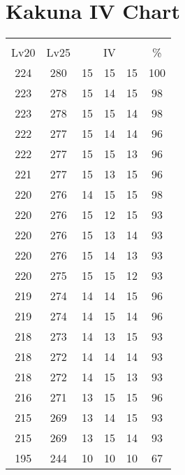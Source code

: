 \documentclass{article}%
\begin{document}
%
\normalsize%
\section{Kakuna IV Chart}%
\label{sec:Kakuna IV Chart}%
\renewcommand{\arraystretch}{1.5}%
\begin{tabular}{|c|c|c|c|c|c|}%
\hline%
\multicolumn{6}{|c|}{\textcolor{white}{ 
\linebreak{Kakuna}
}%
\cellcolor{black}}\\%
\multicolumn{1}{|c}{Lv20}&\multicolumn{1}{c|}{Lv25}&\multicolumn{3}{c|}{IV}&\multicolumn{1}{|c|}{\%}\\%
\hline%
\rowcolor{color100}%
224&280&15&15&15&100\\%
\hline%
\rowcolor{color98}%
223&278&15&14&15&98\\%
\hline%
\rowcolor{color98}%
223&278&15&15&14&98\\%
\hline%
\rowcolor{color96}%
222&277&15&14&14&96\\%
\hline%
\rowcolor{color96}%
222&277&15&15&13&96\\%
\hline%
\rowcolor{color96}%
221&277&15&13&15&96\\%
\hline%
\rowcolor{color98}%
220&276&14&15&15&98\\%
\hline%
\rowcolor{color93}%
220&276&15&12&15&93\\%
\hline%
\rowcolor{color93}%
220&276&15&13&14&93\\%
\hline%
\rowcolor{color93}%
220&276&15&14&13&93\\%
\hline%
\rowcolor{color93}%
220&275&15&15&12&93\\%
\hline%
\rowcolor{color96}%
219&274&14&14&15&96\\%
\hline%
\rowcolor{color96}%
219&274&14&15&14&96\\%
\hline%
\rowcolor{color93}%
218&273&14&13&15&93\\%
\hline%
\rowcolor{color93}%
218&272&14&14&14&93\\%
\hline%
\rowcolor{color93}%
218&272&14&15&13&93\\%
\hline%
\rowcolor{color96}%
216&271&13&15&15&96\\%
\hline%
\rowcolor{color93}%
215&269&13&14&15&93\\%
\hline%
\rowcolor{color93}%
215&269&13&15&14&93\\%
\hline%
\rowcolor{color91}%
195&244&10&10&10&67\\%
\end{tabular}

%
\end{document}
